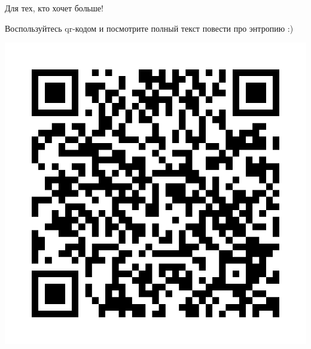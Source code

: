 \documentclass[final]{beamer}
\newlength{\onecolwid}
\begin{document}
\begin{frame}[t]
\begin{columns}[t]
\begin{column}{\onecolwid}






\begin{block}{Для тех, кто хочет больше!}

Воспользуйтесь qr-кодом и посмотрите полный текст повести про энтропию :)

\begin{center}
	\includegraphics[scale=0.3]{qrcode.png}
\end{center}


\end{block}
\end{column}
\end{columns}
\end{frame}
\end{document}
